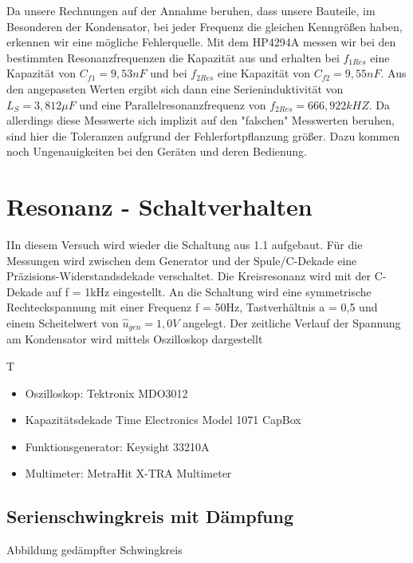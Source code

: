 \documentclass{article}
\begin{document}
Da unsere Rechnungen auf der Annahme beruhen, dass unsere Bauteile, im Besonderen der Kondensator, bei jeder Frequenz die gleichen Kenngrößen haben,
erkennen wir eine mögliche Fehlerquelle. Mit dem HP4294A messen wir bei den bestimmten Resonanzfrequenzen die Kapazität aus und erhalten bei $f_{1Res}$ eine Kapazität
von $C_{f1}=9,53nF$ und bei $f_{2Res}$ eine Kapazität von $C_{f2} = 9,55nF$. Aus den angepassten Werten ergibt sich dann eine Serieninduktivität von $L_S = 3,812\mu F$
und eine Parallelresonanzfrequenz von $f_{2Res} = 666,922kHZ$. Da allerdings diese Messwerte sich implizit auf den "falschen" Messwerten beruhen, sind hier die Toleranzen aufgrund der
Fehlerfortpflanzung größer. Dazu kommen noch Ungenauigkeiten bei den Geräten und deren Bedienung.


\newpage
\section{Resonanz - Schaltverhalten}
\begin{task}
  IIn diesem Versuch wird wieder die Schaltung aus 1.1 aufgebaut. Für die Messungen wird zwischen dem Generator und der Spule/C-Dekade eine Präzisions-Widerstandsdekade verschaltet.
  Die Kreisresonanz wird mit der C-Dekade auf f = 1kHz eingestellt. An die Schaltung wird eine symmetrische Rechteckspannung mit einer Frequenz f = 50Hz, Tastverhältnis a = 0,5 und einem Scheitelwert von $\hat{u}_{gen} = 1,0 V$ angelegt.
  Der zeitliche Verlauf der Spannung am Kondensator wird mittels Oszilloskop dargestellt
\end{task}

\begin{devlist}
  T
  \begin{itemize}
    \item Oszilloskop: Tektronix MDO3012
    \item Kapazitätsdekade Time Electronics Model 1071 CapBox
    \item Funktionsgenerator: Keysight 33210A
    \item Multimeter: MetraHit X-TRA Multimeter
  \end{itemize}
\end{devlist}

\subsection{Serienschwingkreis mit Dämpfung}

Abbildung gedämpfter Schwingkreis\\\\
\end{document}
